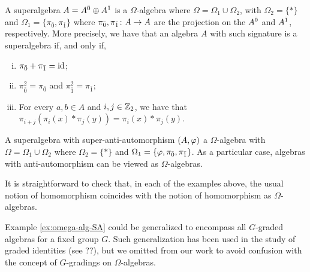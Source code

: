 \begin{ex}\label{ex:omega-alg-SA}
    A superalgebra $A = A^{\bar0} \oplus A^{\bar1}$ is a $\Omega$-algebra where $\Omega = \Omega_1 \cup \Omega_2$, with $\Omega_2 = \{ * \}$ and $\Omega_1 = \{ \pi_{\bar 0}, \pi_{\bar 1} \}$ where $\pi_{\bar 0}, \pi_{\bar 1}\colon A \to A$ are the projection on the $A^{\bar0}$ and $A^{\bar1}$, respectively. 
    More precisely, we have that an algebra $A$ with such signature is a superalgebra if, and only if,
    \begin{enumerate}[(i)]
        \item $\pi_{\bar 0} + \pi_{\bar 1} = \operatorname{id}$; \label{item:sum-projections}
        \item $\pi_{\bar 0}^2 = \pi_{\bar 0}$ and $\pi_{\bar 1}^2 = \pi_{\bar 1}$;
        \item For every $a,b \in A$ and $i, j\in \mathbb{Z}_2$, we have that $\pi_{i+j}( \pi_i(x)*\pi_j(y) ) = \pi_i(x)*\pi_j(y)$.
    \end{enumerate}
\end{ex}


\begin{ex}
    A superalgebra with super-anti-automorphism $(A, \varphi)$ a $\Omega$-algebra with $\Omega = \Omega_1 \cup \Omega_2$ where $\Omega_2 = \{ * \}$ and $\Omega_1 = \{ \varphi, \pi_{\bar 0}, \pi_{\bar 1} \}$. 
    As a particular case, algebras with anti-automorphism can be viewed as $\Omega$-algebras.
\end{ex}

It is straightforward to check that, in each of the examples above, the usual notion of homomorphism coincides with the notion of homomorphism as $\Omega$-algebras.

Example \ref{ex:omega-alg-SA} could be generalized to encompass all $G$-graded algebras for a fixed group $G$. 
Such generalization has been used in the study of graded identities (see ??), but we omitted from our work to avoid confusion with the concept of $G$-gradings on $\Omega$-algebras.

